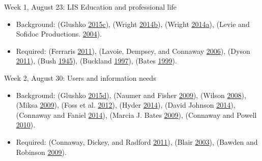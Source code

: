 \documentclass[]{article}
\providecommand{\tightlist}{%
  \setlength{\itemsep}{0pt}\setlength{\parskip}{0pt}}
\begin{document}
Week 1, August 23: LIS Education and professional life

\begin{itemize}
\tightlist
\item
  Background: (Glushko
  \protect\hyperlink{ref-glushkoux5ffoundationux5f2015}{2015}\protect\hyperlink{ref-glushkoux5ffoundationux5f2015}{c}),
  (Wright
  \protect\hyperlink{ref-wrightux5fsecretux5f2014}{2014}\protect\hyperlink{ref-wrightux5fsecretux5f2014}{b}),
  (Wright
  \protect\hyperlink{ref-wrightux5fcatalogingux5f2014}{2014}\protect\hyperlink{ref-wrightux5fcatalogingux5f2014}{a}),
  (Levie and Sofidoc Productions.
  \protect\hyperlink{ref-levieux5fmanux5f2004}{2004}).
\item
  Required: (Ferraris
  \protect\hyperlink{ref-ferrarisux5fsocialux5f2011}{2011}), (Lavoie,
  Dempsey, and Connaway
  \protect\hyperlink{ref-lavoieux5fmakingux5f2006}{2006}), (Dyson
  \protect\hyperlink{ref-dysonux5fhowux5f2011}{2011}), (Bush
  \protect\hyperlink{ref-bushux5fasux5f1945}{1945}), (Buckland
  \protect\hyperlink{ref-bucklandux5fwhatux5f1997}{1997}), (Bates
  \protect\hyperlink{ref-batesux5finvisibleux5f1999}{1999}).
\end{itemize}

Week 2, August 30: Users and information needs

\begin{itemize}
\tightlist
\item
  Background: (Glushko
  \protect\hyperlink{ref-glushkoux5finteractionsux5f2015}{2015}\protect\hyperlink{ref-glushkoux5finteractionsux5f2015}{d}),
  (Naumer and Fisher
  \protect\hyperlink{ref-naumerux5finformationux5f2009}{2009}), (Wilson
  \protect\hyperlink{ref-wilsonux5finformationux5f2008}{2008}), (Miksa
  \protect\hyperlink{ref-miksaux5finformationux5f2009}{2009}), (Foss et
  al. \protect\hyperlink{ref-fossux5fchildrensux5f2012}{2012}), (Hyder
  \protect\hyperlink{ref-hyderux5freadingux5f2014}{2014}), (David
  Johnson
  \protect\hyperlink{ref-davidux5fjohnsonux5fhealth-relatedux5f2014}{2014}),
  (Connaway and Faniel
  \protect\hyperlink{ref-connawayux5freorderingux5f2014}{2014}), (Marcia
  J. Bates
  \protect\hyperlink{ref-marciaux5fj.ux5fbatesux5finformationux5f2009}{2009}),
  (Connaway and Powell
  \protect\hyperlink{ref-connawayux5fselectingux5f2010}{2010}).
\item
  Required: (Connaway, Dickey, and Radford
  \protect\hyperlink{ref-connawayux5fifux5f2011}{2011}), (Blair
  \protect\hyperlink{ref-blairux5freadingux5f2003}{2003}), (Bawden and
  Robinson \protect\hyperlink{ref-bawdenux5fdarkux5f2009}{2009}).
\end{itemize}
\end{document}

